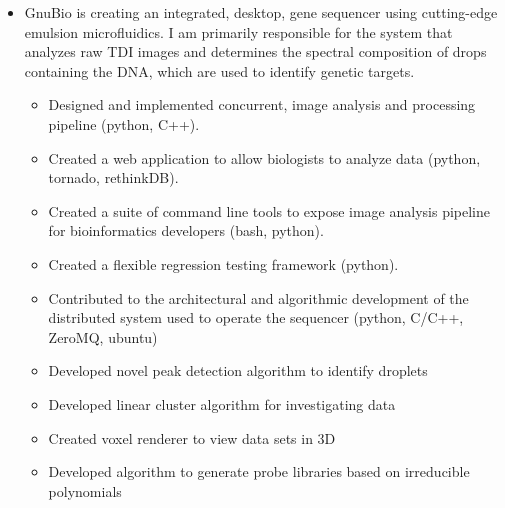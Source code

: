\documentclass[11pt,a4paper,sans]{moderncv}        %
\begin{document}
\begin{itemize}

  \item{}

    GnuBio is creating an integrated, desktop, gene sequencer using cutting-edge
    emulsion microfluidics. I am primarily responsible for the system that
    analyzes raw TDI images and determines the spectral composition of drops
    containing the DNA, which are used to identify genetic targets.

    \begin{itemize}
      \item{Designed and implemented concurrent, image analysis and processing pipeline (python, C++).}
      \item{Created a web application to allow biologists to analyze data (python, tornado, rethinkDB).}
      \item{Created a suite of command line tools to expose image analysis pipeline for bioinformatics developers (bash, python).}
      \item{Created a flexible regression testing framework (python).}
      \item{Contributed to the architectural and algorithmic development of the distributed system used to operate the sequencer (python, C/C++, ZeroMQ, ubuntu)}
      \item{Developed novel peak detection algorithm to identify droplets}
      \item{Developed linear cluster algorithm for investigating data}
      \item{Created voxel renderer to view data sets in 3D}
      \item{Developed algorithm to generate probe libraries based on irreducible polynomials}
    \end{itemize}


\end{itemize}


\vspace{6pt}
\end{document}
